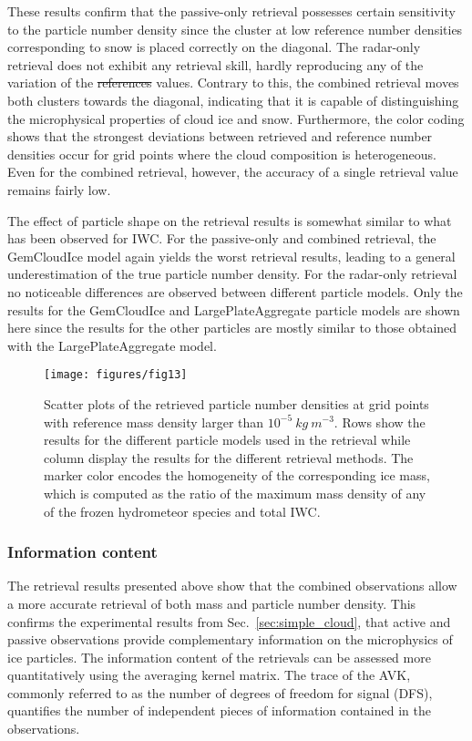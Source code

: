 \documentclass[journal abbreviation, manuscript]{copernicus}
\providecommand{\DIFadd}[1]{{\protect\color{blue}\uwave{#1}}} %
\providecommand{\DIFdel}[1]{{\protect\color{red}\sout{#1}}}                      %
\providecommand{\DIFaddbegin}{} %
\providecommand{\DIFaddend}{} %
\providecommand{\DIFdelbegin}{} %
\providecommand{\DIFdelend}{} %
\begin{document}
These results confirm that the passive-only retrieval possesses certain
sensitivity to the particle number density since the cluster at low reference
number densities corresponding to snow is placed correctly on the diagonal. The
radar-only retrieval does not exhibit any retrieval skill, hardly reproducing
any of the variation of the \DIFdelbegin \DIFdel{references }\DIFdelend \DIFaddbegin \DIFadd{reference }\DIFaddend values. Contrary to this, the combined
retrieval moves both clusters towards the diagonal, indicating that it is
capable of distinguishing the microphysical properties of cloud ice and snow.
Furthermore, the color coding shows that the strongest deviations between
retrieved and reference number densities occur for grid points where the cloud
composition is heterogeneous. Even for the combined retrieval, however, the
accuracy of a single retrieval value remains fairly low.

The effect of particle shape on the retrieval results is somewhat similar to
what has been observed for IWC. For the passive-only and combined retrieval, the
GemCloudIce model again yields the worst retrieval results, leading to a general
underestimation of the true particle number density. For the radar-only
retrieval no noticeable differences are observed between different particle
models. Only the results for the GemCloudIce and LargePlateAggregate particle
models are shown here since the results for the other particles are mostly similar
to those obtained with the LargePlateAggregate model.

\begin{figure}
\centering
\texttt{[image: figures/fig13]}
\caption{Scatter plots of the retrieved particle number densities at grid points
  with reference mass density larger than $10^{-5}\ \unit{kg\ m^{-3}}$. Rows show
  the results for the different particle models used in the retrieval while
  column display the results for the different retrieval methods. The marker
  color encodes the homogeneity of the corresponding ice mass, which is computed
  as the ratio of the maximum mass density of any of the frozen hydrometeor
  species and total IWC.}
\label{fig:results_nd_scatter_a}
\end{figure}

\subsubsection{Information content}

The retrieval results presented above show that the combined observations allow
a more accurate retrieval of both mass and particle number density. This
confirms the experimental results from Sec.~\ref{sec:simple_cloud}, that active
and passive observations provide complementary information on the microphysics
of ice particles. The information content of the retrievals can be assessed more
quantitatively using the averaging kernel matrix. The trace of the AVK, commonly
referred to as the number of degrees of freedom for signal (DFS), quantifies the
number of independent pieces of information contained in the observations.
\end{document}
